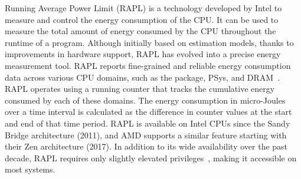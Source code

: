 Running Average Power Limit (RAPL) is a technology developed by Intel to measure and control the energy consumption of the CPU.
It can be used to measure the total amount of energy consumed by the CPU throughout the runtime of a program.
Although initially based on estimation models, thanks to improvements in hardware support, RAPL has evolved into a precise energy measurement tool.
RAPL reports fine-grained and reliable energy consumption data across various CPU domains, such as the package, PSys, and DRAM~\cite{rapl}.
RAPL operates using a running counter that tracks the cumulative energy consumed by each of these domains.
The energy consumption in micro-Joules over a time interval is calculated as the difference in counter values at the start and end of that time period.
RAPL is available on Intel CPUs since the Sandy Bridge architecture (2011), and AMD supports a similar feature starting with their Zen architecture (2017).
In addition to its wide availability over the past decade, RAPL requires only slightly elevated privileges~\cite{rapl-security}, making it accessible on most systems.
